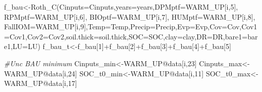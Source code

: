 \documentclass[
  10pt,
  b5paper,
]{book}
\newenvironment{Shaded}{\begin{snugshade}}{\end{snugshade}}
\newcommand{\AttributeTok}[1]{\textcolor[rgb]{0.77,0.63,0.00}{#1}}
\newcommand{\CommentTok}[1]{\textcolor[rgb]{0.56,0.35,0.01}{\textit{#1}}}
\newcommand{\DecValTok}[1]{\textcolor[rgb]{0.00,0.00,0.81}{#1}}
\newcommand{\FunctionTok}[1]{\textcolor[rgb]{0.00,0.00,0.00}{#1}}
\newcommand{\NormalTok}[1]{#1}
\newcommand{\OtherTok}[1]{\textcolor[rgb]{0.56,0.35,0.01}{#1}}
\newcommand{\SpecialCharTok}[1]{\textcolor[rgb]{0.00,0.00,0.00}{#1}}
\begin{document}
\begin{Shaded}
\begin{Highlighting}[]
\NormalTok{f\_bau}\OtherTok{\textless{}{-}}\FunctionTok{Roth\_C}\NormalTok{(}\AttributeTok{Cinputs=}\NormalTok{Cinputs,}\AttributeTok{years=}\NormalTok{years,}\AttributeTok{DPMptf=}\NormalTok{WARM\_UP[i,}\DecValTok{5}\NormalTok{], }\AttributeTok{RPMptf=}\NormalTok{WARM\_UP[i,}\DecValTok{6}\NormalTok{], }\AttributeTok{BIOptf=}\NormalTok{WARM\_UP[i,}\DecValTok{7}\NormalTok{], }\AttributeTok{HUMptf=}\NormalTok{WARM\_UP[i,}\DecValTok{8}\NormalTok{], }\AttributeTok{FallIOM=}\NormalTok{WARM\_UP[i,}\DecValTok{9}\NormalTok{],}\AttributeTok{Temp=}\NormalTok{Temp,}\AttributeTok{Precip=}\NormalTok{Precip,}\AttributeTok{Evp=}\NormalTok{Evp,}\AttributeTok{Cov=}\NormalTok{Cov,}\AttributeTok{Cov1=}\NormalTok{Cov1,}\AttributeTok{Cov2=}\NormalTok{Cov2,}\AttributeTok{soil.thick=}\NormalTok{soil.thick,}\AttributeTok{SOC=}\NormalTok{SOC,}\AttributeTok{clay=}\NormalTok{clay,}\AttributeTok{DR=}\NormalTok{DR,}\AttributeTok{bare1=}\NormalTok{bare1,}\AttributeTok{LU=}\NormalTok{LU)}
\NormalTok{f\_bau\_t}\OtherTok{\textless{}{-}}\NormalTok{f\_bau[}\DecValTok{1}\NormalTok{]}\SpecialCharTok{+}\NormalTok{f\_bau[}\DecValTok{2}\NormalTok{]}\SpecialCharTok{+}\NormalTok{f\_bau[}\DecValTok{3}\NormalTok{]}\SpecialCharTok{+}\NormalTok{f\_bau[}\DecValTok{4}\NormalTok{]}\SpecialCharTok{+}\NormalTok{f\_bau[}\DecValTok{5}\NormalTok{]}

\CommentTok{\#Unc BAU minimum }
\NormalTok{Cinputs\_min}\OtherTok{\textless{}{-}}\NormalTok{WARM\_UP}\SpecialCharTok{@}\NormalTok{data[i,}\DecValTok{23}\NormalTok{]}
\NormalTok{Cinputs\_max}\OtherTok{\textless{}{-}}\NormalTok{WARM\_UP}\SpecialCharTok{@}\NormalTok{data[i,}\DecValTok{24}\NormalTok{]}
\NormalTok{SOC\_t0\_min}\OtherTok{\textless{}{-}}\NormalTok{WARM\_UP}\SpecialCharTok{@}\NormalTok{data[i,}\DecValTok{11}\NormalTok{]}
\NormalTok{SOC\_t0\_max}\OtherTok{\textless{}{-}}\NormalTok{WARM\_UP}\SpecialCharTok{@}\NormalTok{data[i,}\DecValTok{17}\NormalTok{]}


\end{Highlighting}
\end{Shaded}
\end{document}
